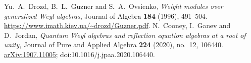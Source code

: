Yu.~A.~Drozd, B.~L.~Guzner and S.~A.~Ovsienko,
\emph{Weight modules over generalized Weyl algebras},
Journal of Algebra \textbf{184} (1996), 491--504.
\url{https://www.imath.kiev.ua/~drozd/Guzner.pdf}.
N.~Cooney, I.~Ganev and D.~Jordan,
\emph{Quantum Weyl algebras and reflection equation algebras at a root of unity},
Journal of Pure and Applied Algebra \textbf{224} (2020), no.~12, 106440.
\href{https://arxiv.org/abs/1907.11005}{arXiv:1907.11005};
doi:10.1016/j.jpaa.2020.106440.
